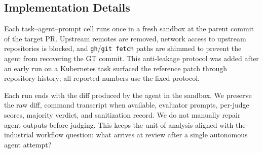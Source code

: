 \subsection{Implementation Details}
\label{sec:execution}

Each task--agent--prompt cell runs once in a fresh sandbox at the parent commit of the target PR. Upstream remotes are removed, network access to upstream repositories is blocked, and \texttt{gh}/\texttt{git fetch} paths are shimmed to prevent the agent from recovering the GT commit. This anti-leakage protocol was added after an early run on a Kubernetes task surfaced the reference patch through repository history; all reported numbers use the fixed protocol.

Each run ends with the diff produced by the agent in the sandbox. We preserve the raw diff, command transcript when available, evaluator prompts, per-judge scores, majority verdict, and sanitization record. We do not manually repair agent outputs before judging. This keeps the unit of analysis aligned with the industrial workflow question: what arrives at review after a single autonomous agent attempt?
